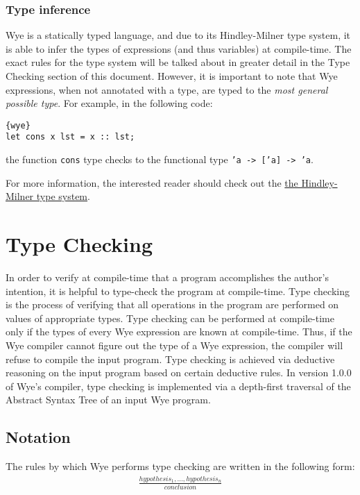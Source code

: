 \documentclass[a4paper, 12pt]{article}
\newcommand{\version}{1.0.0}
\begin{document}
\subsubsection{Type inference}

Wye is a statically typed language, and due to its Hindley-Milner type system, it is able to infer the types of expressions (and thus variables) at compile-time. The exact rules for the type system will be talked about in greater detail in the Type Checking section of this document. However, it is important to note that Wye expressions, when not annotated with a type, are typed to the \textit{most general possible type}. For example, in the following code:
\begin{lstlisting}{wye}
let cons x lst = x :: lst;
\end{lstlisting}
the function \texttt{cons} type checks to the functional type \texttt{'a -> ['a] -> 'a}.

For more information, the interested reader should check out the \href{{https://en.wikipedia.org/wiki/Hindley%

\section{Type Checking}

In order to verify at compile-time that a program accomplishes the author's intention, it is helpful to type-check the program at compile-time. Type checking is the process of verifying that all operations in the program are performed on values of appropriate types. Type checking can be performed at compile-time only if the types of every Wye expression are known at compile-time. Thus, if the Wye compiler cannot figure out the type of a Wye expression, the compiler will refuse to compile the input program. Type checking is achieved via deductive reasoning on the input program based on certain deductive rules. In version \version{} of Wye's compiler, type checking is implemented via a depth-first traversal of the Abstract Syntax Tree of an input Wye program.

\subsection{Notation}

The rules by which Wye performs type checking are written in the following form:
\begin{align*}
\frac{hypothesis_1, ..., hypothesis_n}{conclusion}
\end{align*}
\end{document}

